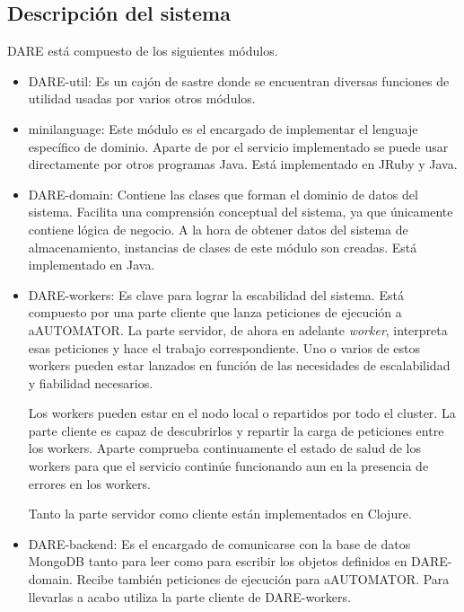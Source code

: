 \subsection{Descripción del sistema}

DARE está compuesto de los siguientes módulos.

\begin{itemize}

  \item DARE-util: Es un cajón de sastre donde se encuentran diversas
    funciones de utilidad usadas por varios otros módulos.

  \item minilanguage: Este módulo es el encargado de implementar el
    lenguaje específico de dominio. Aparte de por el servicio
    implementado se puede usar directamente por otros programas
    Java. Está implementado en JRuby y Java.

  \item DARE-domain: Contiene las clases que forman el dominio de
    datos del sistema. Facilita una comprensión conceptual del
    sistema, ya que únicamente contiene lógica de negocio. A la hora
    de obtener datos del sistema de almacenamiento, instancias de
    clases de este módulo son creadas. Está implementado en Java.

  \item DARE-workers: Es clave para lograr la escabilidad del
    sistema. Está compuesto por una parte cliente que lanza peticiones
    de ejecución a aAUTOMATOR. La parte servidor, de ahora en adelante
    \emph{worker}, interpreta esas peticiones y hace el trabajo
    correspondiente. Uno o varios de estos workers pueden estar
    lanzados en función de las necesidades de escalabilidad y
    fiabilidad necesarios.

    Los workers pueden estar en el nodo local o repartidos por todo el
    cluster. La parte cliente es capaz de descubrirlos y repartir la
    carga de peticiones entre los workers. Aparte comprueba
    continuamente el estado de salud de los workers para que el
    servicio continúe funcionando aun en la presencia de errores en
    los workers.

    Tanto la parte servidor como cliente están implementados en
    Clojure.

  \item DARE-backend: Es el encargado de comunicarse con la base de
    datos MongoDB tanto para leer como para escribir los objetos
    definidos en DARE-domain. Recibe también peticiones de ejecución
    para aAUTOMATOR. Para llevarlas a acabo utiliza la parte cliente
    de DARE-workers.


\end{itemize}
